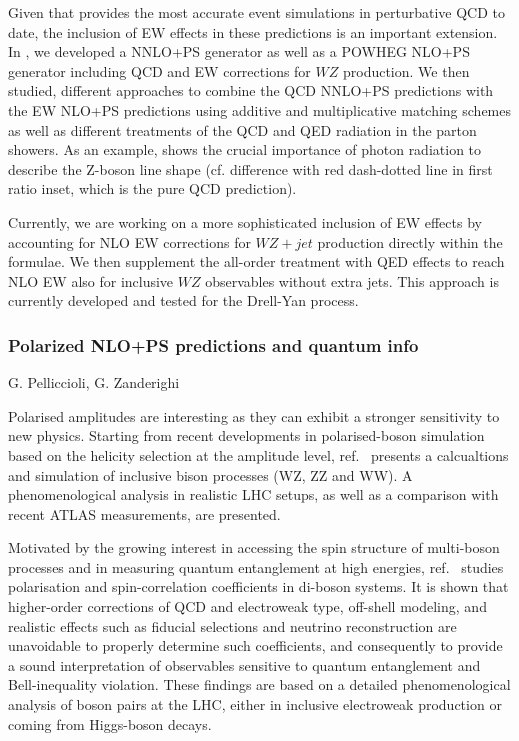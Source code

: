 \documentclass{FBR_Bericht_2025}
\begin{document}
\begin{refsection}
Given that \minnlo{} provides the most accurate event simulations in 
perturbative QCD to date, the inclusion of EW effects in these predictions
is an important extension. In , we developed a \minnlo{} NNLO+PS generator 
as well as a POWHEG NLO+PS  generator including QCD and EW corrections 
for $WZ$ production. We then studied, different approaches to combine the
QCD NNLO+PS predictions with the EW NLO+PS predictions using additive 
and multiplicative matching schemes as well as different treatments of the 
QCD and QED radiation in the parton showers.
As an example,  shows the crucial importance of photon radiation
to describe the Z-boson line shape (cf. difference with 
red dash-dotted line in first ratio inset, which is the pure QCD prediction).

Currently, we are working on a more sophisticated inclusion of EW effects 
by accounting for NLO EW corrections for $WZ+jet$ production
directly within the \minnlo{} formulae. We then supplement the all-order treatment 
with QED effects to reach NLO EW also for inclusive $WZ$ observables without
extra jets. This approach is currently developed and tested for the Drell-Yan process.


\subsubsection{Polarized NLO+PS predictions and quantum info}
\begin{Namen}
G. Pelliccioli, G. Zanderighi
\end{Namen}
%

Polarised amplitudes are interesting as they can exhibit a stronger
sensitivity to new physics.
%
Starting from recent developments in polarised-boson simulation based
on the helicity selection at the amplitude level,
ref.~\cite{Pelliccioli:2023zpd} presents a calcualtions and simulation
of inclusive bison processes (WZ, ZZ and WW). A phenomenological
analysis in realistic LHC setups, as well as a comparison with recent
ATLAS measurements, are presented.

Motivated by the growing interest in accessing the spin structure of
multi-boson processes and in measuring quantum entanglement at high
energies, ref.~\cite{Grossi:2024jae} studies polarisation and
spin-correlation coefficients in di-boson systems. It is shown that
higher-order corrections of QCD and electroweak type, off-shell
modeling, and realistic effects such as fiducial selections and
neutrino reconstruction are unavoidable to properly determine such
coefficients, and consequently to provide a sound interpretation of
observables sensitive to quantum entanglement and Bell-inequality
violation. These findings are based on a detailed phenomenological
analysis of boson pairs at the LHC, either in inclusive electroweak
production or coming from Higgs-boson decays.

\printbibliography[heading=subbibliography]
\end{refsection}
\end{document}
